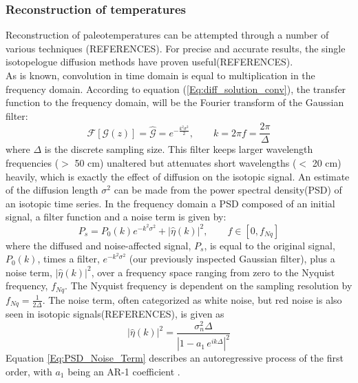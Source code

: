 \documentclass[../../CompleteThesis/Complete_1stDraft.tex]{subfiles}
\begin{document}
\subsubsection{Reconstruction of temperatures}
\label{Subsubsec:Ice_DiffusionAndDensification_Diffusion_TemperatureRecon}
Reconstruction of paleotemperatures can be attempted through a number of various techniques (REFERENCES). For precise and accurate results, the single isotopelogue diffusion methods have proven useful(REFERENCES).\\
As is known, convolution in time domain is equal to multiplication in the frequency domain. According to equation (\ref{Eq:diff_solution_conv}), the transfer function to the frequency domain, will be the Fourier transform of the Gaussian filter:
\begin{equation}
	\mathcal{F}[\mathcal{G}(z)] = \hat{\mathcal{G}} = e^{-\frac{k^2\sigma^2}{2}}, \qquad k = 2\pi f = \frac{2\pi}{\Delta}
	\label{Eq:Transer_Fct}
\end{equation} 
where $\Delta$ is the discrete sampling size. This filter keeps larger wavelength frequencies ($>$ 50 cm) unaltered but attenuates short wavelengths ($<$ 20 cm) heavily, which is exactly the effect of diffusion on the isotopic signal. An estimate of the diffusion length $\sigma^2$ can be made from the power spectral density(PSD) of an isotopic time series. In the frequency domain a PSD composed of an initial signal, a filter function and a noise term is given by:
\begin{equation}
	P_s = P_0(k) e^{-k^2\sigma^2} + |\hat{\eta}(k)|^2, \qquad f \in [0, f_{Nq}]
	\label{Eq:PSD_general}
\end{equation} 
where the diffused and noise-affected signal, $P_s$, is equal to the original signal, $P_0(k)$, times a filter, $e^{-k^2\sigma^2}$ (our previously inspected Gaussian filter), plus a noise term, $|\hat{\eta}(k)|^2$, over a frequency space ranging from zero to the Nyquist frequency, $f_{Nq}$. The Nyquist frequency is dependent on the sampling resolution by $f_{Nq} = \frac{1}{2\Delta}$.
The noise term, often categorized as white noise, but red noise is also seen in isotopic signals(REFERENCES), is given as
\begin{equation}
	|\hat{\eta}(k)|^2 = \frac{\sigma_n^2 \Delta}{|1 - a_1 \, e^{ik\Delta}|^2}
	\label{Eq:PSD_Noise_Term}
\end{equation}
Equation \ref{Eq:PSD_Noise_Term} describes an autoregressive process of the first order, with $a_1$ being an AR-1 coefficient .\\
\end{document}
